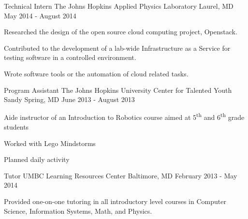 \begin{cventries}
\cventry
{Technical Intern}
{The Johns Hopkins Applied Physics Laboratory}
{Laurel, MD}
{May 2014 - August 2014}
{
    \begin{cvitems}
        \item{Researched the design of the open source cloud computing project, Openstack.}
        \item{Contributed to the development of a lab-wide Infrastructure as a Service for testing software in a controlled environment.}
        \item{Wrote software tools or the automation of cloud related tasks.}
    \end{cvitems}
}

\cventry
{Program Assistant}
{The Johns Hopkins University Center for Talented Youth}
{Sandy Spring, MD}
{June 2013 - August 2013}
{
    \begin{cvitems}
        \item{Aide instructor of an Introduction to Robotics course aimed at 5\textsuperscript{th} and 6\textsuperscript{th} grade students }
        \item{Worked with Lego Mindstorms}
        \item{Planned daily activity}
    \end{cvitems}
}

\cventry
{Tutor}
{UMBC Learning Resources Center}
{Baltimore, MD}
{February 2013 - May 2014}
{
    \begin{cvitems}
        \item{Provided one-on-one tutoring in all introductory level courses in Computer Science, Information Systems, Math, and Physics.}
    \end{cvitems}
}

\end{cventries}
